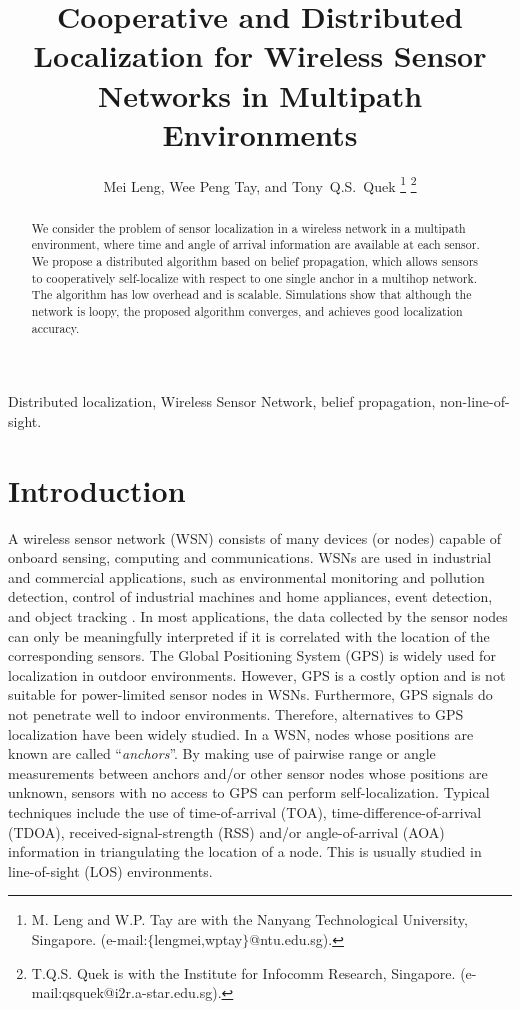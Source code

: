 \documentclass[10pt, twocolumn, final]{IEEEtran}
\title{Cooperative and Distributed Localization for Wireless Sensor Networks in Multipath Environments}
\author{Mei Leng, Wee Peng Tay, and Tony~Q.S.~Quek
\thanks{M. Leng and W.P. Tay are with the Nanyang Technological University, Singapore. (e-mail:$\{$lengmei,wptay$\}$@ntu.edu.sg).}
\thanks{T.Q.S. Quek is with the Institute for Infocomm Research, Singapore. (e-mail:qsquek@i2r.a-star.edu.sg).}}
\begin{document}
\maketitle

\begin{abstract}
We consider the problem of sensor localization in a wireless network in a multipath environment, where time and angle of arrival information are available at each sensor. We propose a distributed algorithm based on belief propagation, which allows sensors to cooperatively self-localize with respect to one single anchor in a multihop network. The algorithm has low overhead and is scalable. Simulations show that although the network is loopy, the proposed algorithm converges, and achieves good localization accuracy.
\end{abstract}

\begin{IEEEkeywords}
Distributed localization, Wireless Sensor Network, belief propagation, non-line-of-sight.
\end{IEEEkeywords}

\section{Introduction}
A wireless sensor network (WSN) consists of many devices (or nodes) capable of onboard sensing, computing and communications. WSNs are used in industrial and commercial applications, such as environmental monitoring and pollution detection, control of industrial machines and home appliances, event detection, and object tracking \cite{Akyildiz2007,Bulusu2005,Tay2009}. In most applications, the data collected by the sensor nodes can only be meaningfully interpreted if it is correlated with the location of the corresponding sensors. The Global Positioning System (GPS) is widely used for localization in outdoor environments\cite{Bulusu2000}. However, GPS is a costly option and is not suitable for power-limited sensor nodes in WSNs. Furthermore, GPS signals do not penetrate well to indoor environments. Therefore, alternatives to GPS localization have been widely studied\cite{Bulusu2000, Wymeersch2009}. In a WSN, nodes whose positions are known are called ``\emph{anchors}''. By making use of pairwise range or angle measurements between anchors and/or other sensor nodes whose positions are unknown, sensors with no access to GPS can perform self-localization. Typical techniques include the use of time-of-arrival (TOA), time-difference-of-arrival (TDOA), received-signal-strength (RSS) and/or angle-of-arrival (AOA) information in triangulating the location of a node. This is usually studied in line-of-sight (LOS) environments\cite{Sun2005, Mao2007}.
\end{document}
